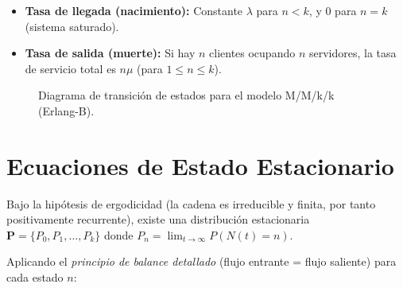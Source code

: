 \documentclass[12pt,a4paper]{article}
\theoremstyle{definition}
\begin{document}
\begin{itemize}
    \item \textbf{Tasa de llegada (nacimiento):} Constante $\lambda$ para $n < k$, y $0$ para $n = k$ (sistema saturado).
    \item \textbf{Tasa de salida (muerte):} Si hay $n$ clientes ocupando $n$ servidores, la tasa de servicio total es $n\mu$ (para $1 \leq n \leq k$).
\end{itemize}

\begin{figure}[h]
    \centering
    \caption{Diagrama de transición de estados para el modelo M/M/k/k (Erlang-B).}
    \label{fig:diagrama}
\end{figure}

\section{Ecuaciones de Estado Estacionario}

Bajo la hipótesis de ergodicidad (la cadena es irreducible y finita, por tanto positivamente recurrente), existe una distribución estacionaria $\mathbf{P} = \{P_0, P_1, \ldots, P_k\}$ donde $P_n = \lim_{t \to \infty} P(N(t) = n)$.

Aplicando el \textit{principio de balance detallado} (flujo entrante = flujo saliente) para cada estado $n$:
\end{document}
